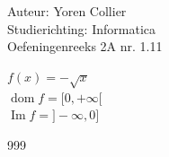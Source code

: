\documentclass[a4paper]{article}
\begin{document}
\noindent \large Auteur: Yoren Collier \\
\noindent \large Studierichting: Informatica\\
\noindent \large Oefeningenreeks 2A nr. 1.11\\

\medskip

\normalsize

$f(x) = -\sqrt{x}$\\

$\operatorname{dom} f = [0, +\infty [$\\

$\operatorname{Im} f = ]-\infty , 0] $\\


\begin{thebibliography}{999}
\end{thebibliography}
\end{document}
